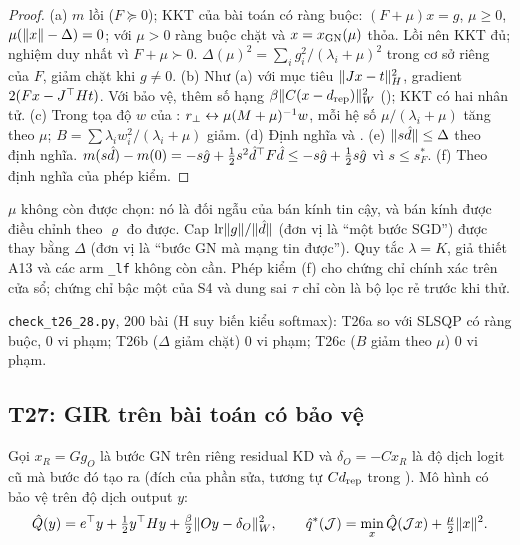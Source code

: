 \begin{proof}
(a) $m$ lồi ($F\succeq0$); KKT của bài toán có ràng buộc: $(F+\mu)x=g$, $\mu\ge0$, $\mu(\lVert x\rVert-\Delta)=0$; với $\mu>0$ ràng buộc chặt và $x=x_{\mathrm{GN}}(\mu)$ thỏa. Lồi nên KKT đủ; nghiệm duy nhất vì $F+\mu\succ0$. $\Delta(\mu)^2=\sum_ig_i^2/(\lambda_i+\mu)^2$ trong cơ sở riêng của $F$, giảm chặt khi $g\ne0$.
(b) Như (a) với mục tiêu $\lVert Jx-t\rVert_H^2$, gradient $2(Fx-J^{\top} Ht)$. Với bảo vệ, thêm số hạng $\beta\lVert C(x-d_{\mathrm{rep}})\rVert_W^2$ (); KKT có hai nhân tử.
(c) Trong tọa độ $w$ của : $r_{\perp}\leftrightarrow\mu(M+\mu)^{-1}w$, mỗi hệ số $\mu/(\lambda_i+\mu)$ tăng theo $\mu$; $B=\sum\lambda_iw_i^2/(\lambda_i+\mu)$ giảm.
(d) Định nghĩa và \cite{madsen2004}.
(e) $\lVert s\hat d\rVert\le\Delta$ theo định nghĩa. $m(s\hat d)-m(0)=-s\hat g+\tfrac12s^2\hat d^{\top} F\hat d\le-s\hat g+\tfrac12s\hat g$ vì $s\le s_F^*$.
(f) Theo định nghĩa của phép kiểm.
\end{proof}
\begin{hequa}
$\mu$ không còn được chọn: nó là đối ngẫu của bán kính tin cậy, và bán kính được điều chỉnh theo $\varrho$ đo được. Cap $\mathrm{lr}\lVert g\rVert/\lVert \hat d\rVert$ (đơn vị là ``một bước SGD'') được thay bằng $\Delta$ (đơn vị là ``bước GN mà mạng tin được''). Quy tắc $\lambda=K$, giả thiết A13 và các arm \texttt{\_lf} không còn cần. Phép kiểm (f) cho chứng chỉ chính xác trên cửa sổ; chứng chỉ bậc một của S4 và dung sai $\tau$ chỉ còn là bộ lọc rẻ trước khi thử.
\end{hequa}
\begin{kiem}
\texttt{check\_t26\_28.py}, 200 bài (H suy biến kiểu softmax): T26a so với SLSQP có ràng buộc, 0 vi phạm; T26b ($\Delta$ giảm chặt) 0 vi phạm; T26c ($B$ giảm theo $\mu$) 0 vi phạm.
\end{kiem}

\subsection{T27: GIR trên bài toán có bảo vệ}

Gọi $x_R=G g_O$ là bước GN trên riêng residual KD và $\delta_O=-Cx_R$ là độ dịch logit cũ mà bước đó tạo ra (đích của phần sửa, tương tự $Cd_{\mathrm{rep}}$ trong ). Mô hình có bảo vệ trên độ dịch output $y$:
\[
\hat Q(y)=e^{\top} y+\tfrac12y^{\top} Hy+\tfrac\beta2\lVert Oy-\delta_O\rVert_W^2,\qquad \hat q^*(\mathcal{J})=\min_x\hat Q(\mathcal{J} x)+\tfrac\mu2\lVert x\rVert^2 .
\]

